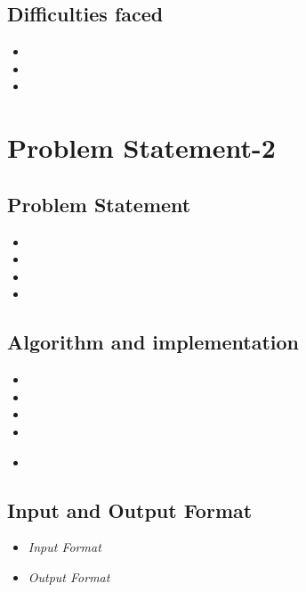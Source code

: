\documentclass[10pt]{article}
\begin{document}
\subsection{Difficulties faced}
\begin{itemize}
	\item 
	\item 
	\item
\end{itemize}

\newpage





\section{\textbf{\large Problem Statement-2}}
\subsection{Problem Statement}
\textbf{ }
\begin{itemize}
		\item  
		\item 
		\item 
		\item 
			
		
\end{itemize}

\subsection{Algorithm and implementation}
\begin{itemize}
		\item 
		\item  
		\item 
		\item 
		\item \cite{3}
\end{itemize}

\newpage



\subsection{Input and Output Format}
\begin{itemize}
	\item \textit{Input Format}
	\subitem 
	\item \textit{Output Format}
	\subitem 
	\subitem 
	\subitem 
	\subitem 
	\subitem  
\end{itemize}
\end{document}
